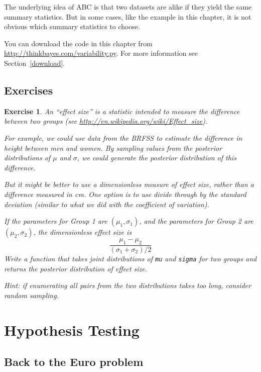 \documentclass[12pt]{book}
\theoremstyle{exercise}
\newtheorem{exercise}{Exercise}[chapter]
\begin{document}
The underlying idea of ABC is that two datasets are alike if they yield
the same summary statistics.  But in some cases, like the example in
this chapter, it is not obvious which summary statistics to choose.

You can download the code in this chapter from
\url{http://thinkbayes.com/variability.py}.
  For more information
see Section~\ref{download}.

\section{Exercises}

\begin{exercise}

An ``effect size'' is a statistic intended to measure the difference
between two groups (see
\url{http://en.wikipedia.org/wiki/Effect_size}).

For example, we could use data from the BRFSS to estimate the
difference in height between men and women.  By sampling values
from the posterior distributions of $\mu$ and
$\sigma$, we could generate the posterior distribution of this
difference.

But it might be better to use a dimensionless measure of effect
size, rather than a difference measured in cm.  One option is
to use divide through by the standard deviation (similar to what
we did with the coefficient of variation).

If the parameters for Group 1 are $(\mu_1, \sigma_1)$, and the
parameters for Group 2 are $(\mu_2, \sigma_2)$, the dimensionless
effect size is
%
\[ \frac{\mu_1 - \mu_2}{(\sigma_1 + \sigma_2)/2} \]
%
Write a function that takes joint distributions of
{\tt mu} and {\tt sigma} for two groups and returns
the posterior distribution of effect size.

Hint: if enumerating all pairs from the two distributions takes too
long, consider random sampling.

\end{exercise}



\chapter{Hypothesis Testing}
\label{hypotest}

\section{Back to the Euro problem}
\end{document}
